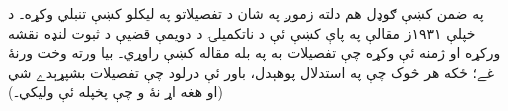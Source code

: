 \documentclass[../../../include/open-logic-section]{subfiles}
\begin{document}
\begin{digress}
په ضمن کښې ګوډل هم دلته زموږ په شان د تفصيلاتو په ليکلو کښې
تنبلي وکړه۔ د خپلې ۱۹۳۱ز مقالې په پاې کښې ئې د ناتکميلۍ د دويمې
قضيې د ثبوت لنډه نقشه ورکړه او ژمنه ئې وکړه چې تفصيلات به په بله
مقاله کښې راوړي۔ بيا ورته وخت ورنۀ غے؛ ځکه هر څوک چې په استدلال
پوهېدل، باور ئې درلود چې تفصيلات بشپړېدے شي (او هغه اړ نۀ و چې
پخپله ئې وليکي۔)
\end{digress}
\end{document}
